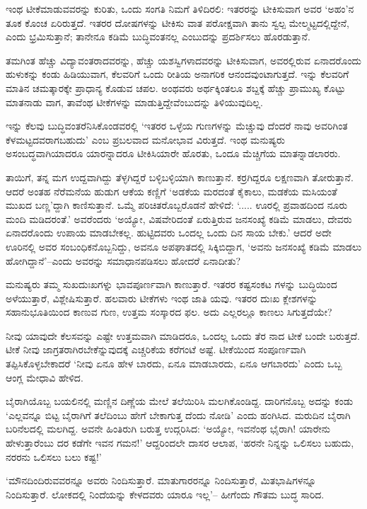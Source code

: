 ಇಂಥ ಟೀಕೆಮಾಡುವವರನ್ನು ಕುರಿತು, ಒಂದು ಸಂಗತಿ ನಿಮಗೆ ತಿಳಿದಿರಲಿ: ಇತರರನ್ನು ಟೀಕಿಸುವಾಗ ಅವರ ‘ಅಹಂ’ನ ತೂಕ ಕೊಂಚ ಏರಿರುತ್ತದೆ. ಇತರರ ದೋಷಗಳನ್ನು ಟೀಕಿಸು ವಾತ ಪರೋಕ್ಷವಾಗಿ ತಾನು ಸ್ವಲ್ಪ ಮೇಲ್ಮಟ್ಟದಲ್ಲಿದ್ದೇನೆ, ಎಂದು ಭ್ರಮಿಸುತ್ತಾನೆ; ತಾನೇನೂ ಕಡಿಮೆ ಬುದ್ಧಿವಂತನಲ್ಲ ಎಂಬುದನ್ನು ಪ್ರದರ್ಶಿಸಲು ಹೊರಡುತ್ತಾನೆ.

ತಮಗಿಂತ ಹೆಚ್ಚು ವಿದ್ಯಾವಂತರಾದವರನ್ನು, ಹೆಚ್ಚು ಯಶಸ್ವಿಗಳಾದವರನ್ನು ಟೀಕಿಸುವಾಗ, ಅವರಲ್ಲಿರುವ ಏನಾದರೊಂದು ಹುಳುಕನ್ನು ಕಂಡು ಹಿಡಿಯುವಾಗ, ಕೆಲವರಿಗೆ ಒಂದು ರೀತಿಯ ಅನಾಗರಿಕ ಆನಂದವುಂಟಾಗುತ್ತದೆ. ಇನ್ನು ಕೆಲವರಿಗೆ ಮಾತಿನ ಚಮತ್ಕಾರಕ್ಕೇ ಪ್ರಾಧಾನ್ಯ ಕೊಡುವ ಚಪಲ. ಅಂಥವರು ಅರ್ಥಕ್ಕಿಂತಲೂ ಶಬ್ದಕ್ಕೆ ಹೆಚ್ಚು ಪ್ರಾಮುಖ್ಯ ಕೊಟ್ಟು ಮಾತನಾಡು ವಾಗ, ತಾವೆಂಥ ಟೀಕೆಗಳನ್ನು ಮಾಡುತ್ತಿದ್ದೇವೆಂಬುದನ್ನು ತಿಳಿಯುವುದಿಲ್ಲ.

ಇನ್ನು ಕೆಲವು ಬುದ್ಧಿವಂತರೆನಿಸಿಕೊಂಡವರಲ್ಲಿ ‘ಇತರರ ಒಳ್ಳೆಯ ಗುಣಗಳನ್ನು ಮೆಚ್ಚುವು ದೆಂದರೆ ನಾವು ಅವರಿಗಿಂತ ಕೆಳಮಟ್ಟದವರಾಗಬಹುದು’ ಎಂಬ ಪ್ರಬಲವಾದ ಮನೋಭಾವ ವಿರುತ್ತದೆ. ಇಂಥ ಮನುಷ್ಯರು ಅಸಂಬದ್ಧವಾಗಿಯಾದರೂ ಯಾರನ್ನಾದರೂ ಟೀಕಿಸಿಯಾರೇ ಹೊರತು, ಒಂದೂ ಮೆಚ್ಚಿಗೆಯ ಮಾತನ್ನಾಡಲಾರರು.

ತಾಯಿಗೆ, ತನ್ನ ಮಗ ಉದ್ದವಾಗಿದ್ದು ತೆಳ್ಳಗಿದ್ದರೆ ಬಳ್ಳಿಬಳ್ಳಿಯಾಗಿ ಕಾಣುತ್ತಾನೆ. ಕರ್ರಗಿದ್ದರೂ ಲಕ್ಷಣವಾಗಿ ತೋರುತ್ತಾನೆ. ಆದರೆ ಅಂತಹ ನೆರೆಮನೆಯ ಹುಡುಗ ಆಕೆಯ ಕಣ್ಣಿಗೆ ‘ಅಡಕೆಯ ಮರದಂತೆ ಕೈಕಾಲು, ಮಡಕೆಯ ಮಸಿಯಂತೆ ಮುಖದ ಬಣ್ಣ’ದ್ದಾಗಿ ಕಾಣಿಸುತ್ತಾನೆ. ಒಮ್ಮೆ ಪರಿಚಿತರೊಬ್ಬರೊಡನೆ ಹೇಳಿದೆ: ‘..... ಊರಲ್ಲಿ ಪ್ರವಾಹದಿಂದ ನೂರು ಮಂದಿ ಮಡಿದರಂತೆ.’ ಅವರೆಂದರು ‘ಅಯ್ಯೋ, ವಿಷವೇರಿದಂತೆ ಏರುತ್ತಿರುವ ಜನಸಂಖ್ಯೆ ಕಡಿಮೆ ಮಾಡಲು, ದೇವರು ಏನಾದರೊಂದು ಉಪಾಯ ಮಾಡಬೇಕಲ್ಲ. ಹುಟ್ಟಿದವರು ಒಂದಲ್ಲ ಒಂದು ದಿನ ಸಾಯ ಬೇಕು.’ ಆದರೆ ಅದೇ ಊರಿನಲ್ಲಿ ಅವರ ಸಂಬಂಧಿಕನೊಬ್ಬನಿದ್ದು, ಅವನೂ ಅಪಘಾತದಲ್ಲಿ ಸಿಕ್ಕಿಬಿದ್ದಾಗ, ‘ಅವನು ಜನಸಂಖ್ಯೆ ಕಡಿಮೆ ಮಾಡಲು ಹೋಗಿದ್ದಾನೆ’–ಎಂದು ಅವರನ್ನು ಸಮಾಧಾನಪಡಿಸಲು ಹೋದರೆ ಏನಾದೀತು?

ಮನುಷ್ಯರು ತಮ್ಮ ಸುಖದುಃಖಗಳ್ನು ಭಾವಪೂರ್ಣವಾಗಿ ಕಾಣುತ್ತಾರೆ. ಇತರರ ಕಷ್ಟಸಂಕಟ ಗಳನ್ನು ಬುದ್ಧಿಯಿಂದ ಅಳೆಯುತ್ತಾರೆ, ವಿಶ್ಲೇಷಿಸುತ್ತಾರೆ. ಹಲವಾರು ಟೀಕೆಗಳು ಇಂಥ ಜಾತಿ ಯವು. ಇತರರ ದುಃಖ ಕ್ಲೇಶಗಳನ್ನು ಸಹಾನುಭೂತಿಯಿಂದ ಕಾಣುವ ಗುಣ, ಉತ್ತಮ ಸಂಸ್ಕಾರದ ಫಲ. ಅದು ಎಲ್ಲರಲ್ಲೂ ಕಾಣಲು ಸಿಗುತ್ತದೆಯೇ?

ನೀವು ಯಾವುದೇ ಕೆಲಸವನ್ನು ಎಷ್ಟೇ ಉತ್ತಮವಾಗಿ ಮಾಡಿದರೂ, ಒಂದಲ್ಲ ಒಂದು ತೆರ ನಾದ ಟೀಕೆ ಬಂದೇ ಬರುತ್ತದೆ. ಟೀಕೆ ನೀವು ಜಾಗ್ರತರಾಗಿರಬೇಕೆನ್ನುವುದಕ್ಕೆ ಎಚ್ಚರಿಕೆಯ ಕರೆಗಂಟೆ ಅಷ್ಟೆ. ಟೀಕೆಯಿಂದ ಸಂಪೂರ್ಣವಾಗಿ ತಪ್ಪಿಸಿಕೊಳ್ಳಬೇಕಾದರೆ ‘ನೀವು ಏನೂ ಹೇಳ ಬಾರದು, ಏನೂ ಮಾಡಬಾರದು, ಏನೂ ಆಗಬಾರದು’ ಎಂದು ಒಬ್ಬ ಆಂಗ್ಲ ಮೇಧಾವಿ ಹೇಳಿದ.

ಬೈರಾಗಿಯೊಬ್ಬ ಬಯಲಿನಲ್ಲಿ ಮಣ್ಣಿನ ದಿಣ್ಣೆಯ ಮೇಲೆ ತಲೆಯಿರಿಸಿ ಮಲಗಿಕೊಂಡಿದ್ದ. ದಾರಿಗನೊಬ್ಬ ಅದನ್ನು ಕಂಡು ‘ಎಲ್ಲವನ್ನೂ ಬಿಟ್ಟ ಬೈರಾಗಿಗೆ ತಲೆದಿಂಬು ಹೇಗೆ ಬೇಕಾಗುತ್ತ ದೆಂದು ನೋಡಿ’ ಎಂದು ಹಂಗಿಸಿದ. ಮರುದಿನ ಬೈರಾಗಿ ಬರಿನೆಲದಲ್ಲಿ ಮಲಗಿದ್ದ. ಅವನೇ ಹಿಂತಿರುಗಿ ಬರುತ್ತ ಉದ್ಗರಿಸಿದ: ‘ಅಯ್ಯೋ, ಇವನೆಂಥ ಭೈರಾಗಿ! ಯಾರೇನು ಹೇಳುತ್ತಾರೆಂಬು ದರ ಕಡೆಗೇ ಇವನ ಗಮನ!’ ಆದ್ದರಿಂದಲೇ ದಾಸರ ಆಲಾಪ, ‘ಹರನೇ ನಿನ್ನನ್ನು ಒಲಿಸಲು ಬಹುದು, ನರರನು ಒಲಿಸಲು ಬಲು ಕಷ್ಟ!’

‘ಮೌನದಿಂದಿರುವವರನ್ನೂ ಅವರು ನಿಂದಿಸುತ್ತಾರೆ. ಮಾತುಗಾರರನ್ನೂ ನಿಂದಿಸುತ್ತಾರೆ, ಮಿತಭಾಷಿಗಳನ್ನೂ ನಿಂದಿಸುತ್ತಾರೆ. ಲೋಕದಲ್ಲಿ ನಿಂದೆಯನ್ನು ಕೇಳದವರು ಯಾರೂ ಇಲ್ಲ’– ಹೀಗೆಂದು ಗೌತಮ ಬುದ್ಧ ಸಾರಿದ.

